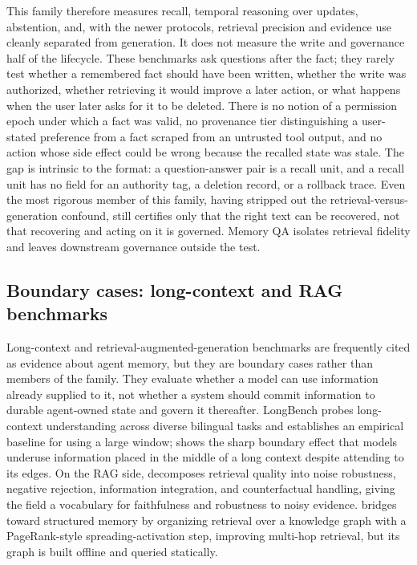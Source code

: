 This family therefore measures recall, temporal reasoning over updates, abstention, and, with the newer protocols, retrieval precision and evidence use cleanly separated from generation. It does not measure the write and governance half of the lifecycle. These benchmarks ask questions after the fact; they rarely test whether a remembered fact should have been written, whether the write was authorized, whether retrieving it would improve a later action, or what happens when the user later asks for it to be deleted. There is no notion of a permission epoch under which a fact was valid, no provenance tier distinguishing a user-stated preference from a fact scraped from an untrusted tool output, and no action whose side effect could be wrong because the recalled state was stale. The gap is intrinsic to the format: a question-answer pair is a recall unit, and a recall unit has no field for an authority tag, a deletion record, or a rollback trace. Even the most rigorous member of this family, having stripped out the retrieval-versus-generation confound, still certifies only that the right text can be recovered, not that recovering and acting on it is governed. Memory QA isolates retrieval fidelity and leaves downstream governance outside the test.

\subsection{Boundary cases: long-context and RAG benchmarks}

Long-context and retrieval-augmented-generation benchmarks are frequently cited as evidence about agent memory, but they are boundary cases rather than members of the family. They evaluate whether a model can use information already supplied to it, not whether a system should commit information to durable agent-owned state and govern it thereafter. LongBench \citep{bai2024longbenchbilingualmultitaskbenchmark} probes long-context understanding across diverse bilingual tasks and establishes an empirical baseline for using a large window; \citet{liu2023lostmiddlelanguagemodels} shows the sharp boundary effect that models underuse information placed in the middle of a long context despite attending to its edges. On the RAG side, \citet{chen2023benchmarkinglargelanguagemodels} decomposes retrieval quality into noise robustness, negative rejection, information integration, and counterfactual handling, giving the field a vocabulary for faithfulness and robustness to noisy evidence. \citet{gutierrez2024hipporag} bridges toward structured memory by organizing retrieval over a knowledge graph with a PageRank-style spreading-activation step, improving multi-hop retrieval, but its graph is built offline and queried statically.

